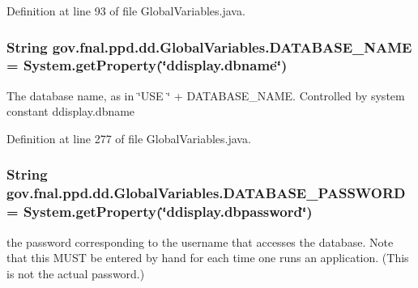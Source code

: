 Definition at line 93 of file Global\-Variables.\-java.

\hypertarget{classgov_1_1fnal_1_1ppd_1_1dd_1_1GlobalVariables_a737045676a15c469e5cb486d80c08043}{
\subsubsection[{D\-A\-T\-A\-B\-A\-S\-E\-\_\-\-N\-A\-M\-E}]{\setlength{\rightskip}{0pt plus 5cm}String gov.\-fnal.\-ppd.\-dd.\-Global\-Variables.\-D\-A\-T\-A\-B\-A\-S\-E\-\_\-\-N\-A\-M\-E = System.\-get\-Property(\char`\"{}ddisplay.\-dbname\char`\"{})\hspace{0.3cm}{\ttfamily [static]}}}\label{classgov_1_1fnal_1_1ppd_1_1dd_1_1GlobalVariables_a737045676a15c469e5cb486d80c08043}
The database name, as in \char`\"{}\-U\-S\-E \char`\"{} + D\-A\-T\-A\-B\-A\-S\-E\-\_\-\-N\-A\-M\-E. Controlled by system constant ddisplay.\-dbname 

Definition at line 277 of file Global\-Variables.\-java.

\hypertarget{classgov_1_1fnal_1_1ppd_1_1dd_1_1GlobalVariables_ae63bd973c9c02683b0c4964179ceefe0}{
\subsubsection[{D\-A\-T\-A\-B\-A\-S\-E\-\_\-\-P\-A\-S\-S\-W\-O\-R\-D}]{\setlength{\rightskip}{0pt plus 5cm}String gov.\-fnal.\-ppd.\-dd.\-Global\-Variables.\-D\-A\-T\-A\-B\-A\-S\-E\-\_\-\-P\-A\-S\-S\-W\-O\-R\-D = System.\-get\-Property(\char`\"{}ddisplay.\-dbpassword\char`\"{})\hspace{0.3cm}{\ttfamily [static]}}}\label{classgov_1_1fnal_1_1ppd_1_1dd_1_1GlobalVariables_ae63bd973c9c02683b0c4964179ceefe0}
the password corresponding to the username that accesses the database. Note that this M\-U\-S\-T be entered by hand for each time one runs an application. (This is not the actual password.) 

